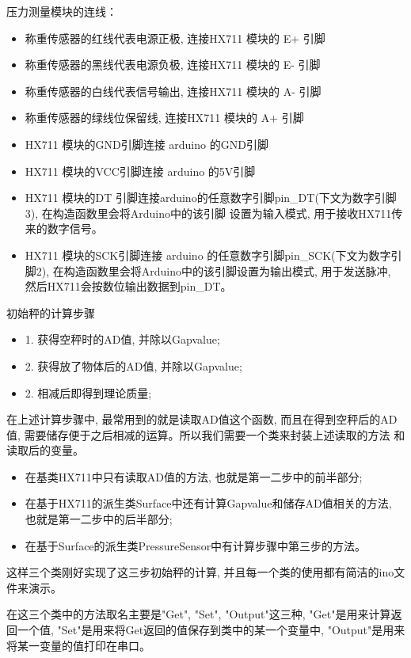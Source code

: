 \documentclass{article}
\begin{document}
	压力测量模块的连线：
\begin{itemize}
	\item 称重传感器的红线代表电源正极, 连接HX711 模块的 E+ 引脚
	\item 称重传感器的黑线代表电源负极, 连接HX711 模块的 E- \hspace{0.5em}引脚
	\item 称重传感器的白线代表信号输出, 连接HX711 模块的 A- \hspace{0.5em}引脚
	\item 称重传感器的绿线位保留线, 连接HX711 模块的 A+ 引脚		
	\item HX711 模块的GND引脚连接 arduino 的GND引脚
	\item HX711 模块的VCC引脚连接 arduino 的5V引脚
	\item HX711 模块的DT\hspace{0.5em} 引脚连接arduino的任意数字引脚pin\_DT(下文为数字引脚3), 在构造函数里会将Arduino中的该引脚
	设置为输入模式, 用于接收HX711传来的数字信号。
	\item HX711 模块的SCK引脚连接 arduino 的任意数字引脚pin\_SCK(下文为数字引脚2), 在构造函数里会将Arduino中的该引脚设置为输出模式,
	用于发送脉冲, 然后HX711会按数位输出数据到pin\_DT。
\end{itemize}

初始秤的计算步骤
\begin{itemize}
  \item 1. 获得空秤时的AD值, 并除以Gapvalue;
  \item 2. 获得放了物体后的AD值, 并除以Gapvalue;
  \item 2. 相减后即得到理论质量;
\end{itemize}

在上述计算步骤中, 最常用到的就是读取AD值这个函数, 而且在得到空秤后的AD值, 需要储存便于之后相减的运算。所以我们需要一个类来封装上述读取的方法
和读取后的变量。 \par
\begin{itemize}
  \item 在基类HX711中只有读取AD值的方法, 也就是第一二步中的前半部分;
  \item 在基于HX711的派生类Surface中还有计算Gapvalue和储存AD值相关的方法, 也就是第一二步中的后半部分;
  \item 在基于Surface的派生类PressureSensor中有计算步骤中第三步的方法。
\end{itemize} 
这样三个类刚好实现了这三步初始秤的计算, 并且每一个类的使用都有简洁的ino文件来演示。 \par
在这三个类中的方法取名主要是"Get", "Set", "Output"这三种, "Get"是用来计算返回一个值, "Set"是用来将Get返回的值保存到类中的某一个变量中, 
"Output"是用来将某一变量的值打印在串口。
\end{document}
